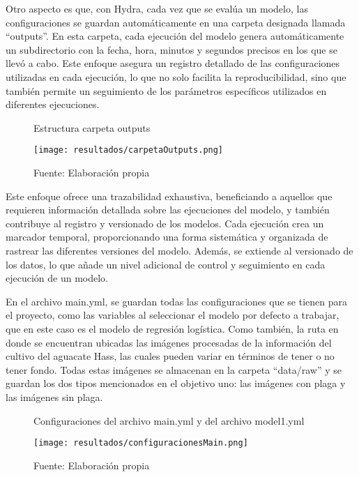 Otro aspecto es que, con Hydra, cada vez que se evalúa un modelo, las configuraciones se guardan automáticamente en una carpeta designada llamada ``outputs''. En esta carpeta, cada ejecución del modelo genera automáticamente un subdirectorio con la fecha, hora, minutos y segundos precisos en los que se llevó a cabo. Este enfoque asegura un registro detallado de las configuraciones utilizadas en cada ejecución, lo que no solo facilita la reproducibilidad, sino que también permite un seguimiento de los parámetros específicos utilizados en diferentes ejecuciones.

\begin{figure}[h]
\centering
\caption{Estructura carpeta outputs}
\texttt{[image: resultados/carpetaOutputs.png]}
\caption*{\footnotesize Fuente: Elaboración propia}
\label{fig:figuraEstructuraCarpetaOutputs}
\end{figure}

\newpage

Este enfoque ofrece una trazabilidad exhaustiva, beneficiando a aquellos que requieren información detallada sobre las ejecuciones del modelo, y también contribuye al registro y versionado de los modelos. Cada ejecución crea un marcador temporal, proporcionando una forma sistemática y organizada de rastrear las diferentes versiones del modelo. Además, se extiende al versionado de los datos, lo que añade un nivel adicional de control y seguimiento en cada ejecución de un modelo. \newline

En el archivo main.yml, se guardan todas las configuraciones que se tienen para el proyecto, como las variables al seleccionar el modelo por defecto a trabajar, que en este caso es el modelo de regresión logística. Como también, la ruta en donde se encuentran ubicadas las imágenes procesadas de la información del cultivo del aguacate Hass, las cuales pueden variar en términos de tener o no tener fondo. Todas estas imágenes se almacenan en la carpeta “data/raw” y se guardan los dos tipos mencionados en el objetivo uno: las imágenes con plaga y las imágenes sin plaga.

\begin{figure}[h]
\centering
\caption{Configuraciones del archivo main.yml y del archivo model1.yml}
\texttt{[image: resultados/configuracionesMain.png]}
\caption*{\footnotesize Fuente: Elaboración propia}
\label{fig:figuraConfiguracionesMain}
\end{figure}

